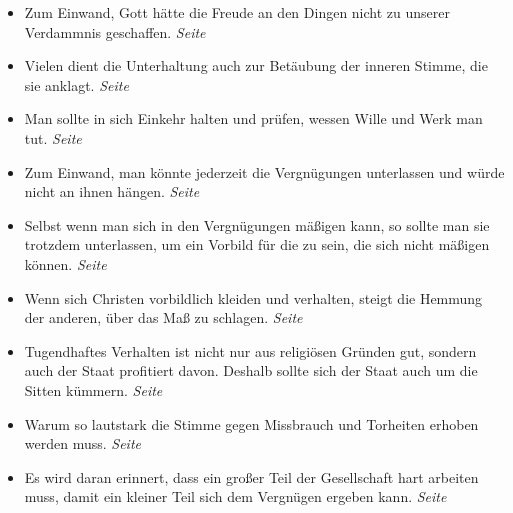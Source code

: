 \begin{itemize}
\begin{itemize}
 \item Zum Einwand, Gott hätte die Freude an den Dingen nicht zu unserer
Verdammnis geschaffen.
 \dotfill \textit{Seite~\pageref{ref:17_11_einwand_2}}\\

 \item Vielen dient die Unterhaltung auch zur Betäubung der inneren Stimme, die
sie anklagt.
 \dotfill \textit{Seite~\pageref{ref:17_11_beteubung}}\\

 \item Man sollte in sich Einkehr halten und prüfen, wessen Wille und Werk
man tut.
 \dotfill \textit{Seite~\pageref{ref:17_12_einkehr}}\\

 \item Zum Einwand, man könnte jederzeit die Vergnügungen unterlassen und würde
nicht an ihnen hängen.
 \dotfill \textit{Seite~\pageref{ref:18_02_einwand}}\\

 \item Selbst wenn man sich in den Vergnügungen mäßigen kann, so sollte man sie
trotzdem unterlassen, um ein Vorbild für die zu sein, die sich nicht mäßigen
können.
 \dotfill \textit{Seite~\pageref{ref:18_03_vorbild}}\\

 \item Wenn sich Christen vorbildlich kleiden und verhalten, steigt die Hemmung
der anderen, über das Maß zu schlagen.
 \dotfill \textit{Seite~\pageref{ref:18_08_vorbild_kleidung}}\\

 \item Tugendhaftes Verhalten ist nicht nur aus religiösen Gründen gut, sondern
auch der Staat profitiert davon. Deshalb sollte sich der Staat auch um die
Sitten kümmern.
 \dotfill \textit{Seite~\pageref{ref:18_09_gesellschaftlich}}\\

 \item Warum so lautstark die Stimme gegen Missbrauch und Torheiten erhoben
werden muss.
 \dotfill \textit{Seite~\pageref{ref:18_09_lautstark}}\\

 \item Es wird daran erinnert, dass ein großer Teil der Gesellschaft hart
arbeiten muss, damit ein kleiner Teil sich dem Vergnügen ergeben kann.
 \dotfill \textit{Seite~\pageref{ref:18_10_ungeraechtikeit}}\\


\end{itemize}
\end{itemize}
